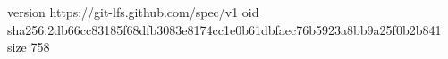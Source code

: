 version https://git-lfs.github.com/spec/v1
oid sha256:2db66cc83185f68dfb3083e8174cc1e0b61dbfaec76b5923a8bb9a25f0b2b841
size 758
